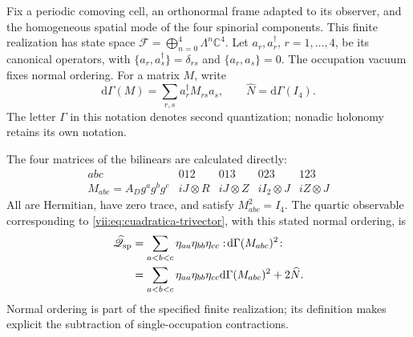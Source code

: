 Fix a periodic comoving cell, an orthonormal frame adapted to its
observer, and the homogeneous spatial mode of the four spinorial
components. This finite realization has state space
\(\mathcal F=\bigoplus_{n=0}^4\Lambda^n\mathbb C^4\).
Let \(a_r,a_r^\dagger\), \(r=1,\ldots,4\), be its canonical
operators, with
\(\{a_r,a_s^\dagger\}=\delta_{rs}\) and
\(\{a_r,a_s\}=0\). The occupation vacuum fixes normal
ordering. For a matrix \(M\), write
\[
 \mathrm d\Gamma(M)=\sum_{r,s}a_r^\dagger M_{rs}a_s,
 \qquad \widehat N=\mathrm d\Gamma(I_4).
\]
The letter \(\Gamma\) in this notation denotes second
quantization; nonadic holonomy retains its own notation.

The four matrices of the bilinears are calculated directly:
\begin{equation}
 \begin{array}{c|cccc}
 abc&012&013&023&123\\ \hline
 M_{abc}=A_Dg^ag^bg^c
       &iJ\otimes R&iJ\otimes Z&iI_2\otimes J&iZ\otimes J
 \end{array}
 \label{vii:eq:matrices-bilineales-espin}
\end{equation}
All are Hermitian, have zero trace, and satisfy
\(M_{abc}^2=I_4\). The quartic observable corresponding to
\eqref{vii:eq:cuadratica-trivector}, with this stated normal ordering,
is
\begin{equation}
 \begin{split}
 \widehat{\mathscr Q}_{\rm sp}
 &=\sum_{a<b<c}\eta_{aa}\eta_{bb}\eta_{cc}
       :\!\mathrm d\Gamma(M_{abc})^2\!:\\
 &=\sum_{a<b<c}\eta_{aa}\eta_{bb}\eta_{cc}
       \mathrm d\Gamma(M_{abc})^2+2\widehat N.
 \end{split}
 \label{vii:eq:observable-cuadratico-espin}
\end{equation}
Normal ordering is part of the specified finite realization;
its definition makes explicit the subtraction of single-occupation
contractions.

